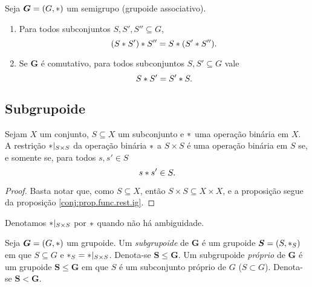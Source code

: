 \begin{exercise}
Seja $\bm G=(G,\ast)$ um semigrupo (grupoide associativo).
	\begin{enumerate}
	\item Para todos subconjuntos $S,S',S'' \subseteq G$,
		\begin{equation*}
		(S \ast S') \ast S'' = S \ast (S' \ast S'').
		\end{equation*}
	\item Se $\bm G$ é comutativo, para todos subconjuntos $S,S' \subseteq G$ vale
		\begin{equation*}
		S \ast S' = S' \ast S.
		\end{equation*}
	\end{enumerate}
\end{exercise}


\subsection{Subgrupoide}

\begin{proposition}[Fechamento]
\label{prop:fechamento.operacao.binaria}
Sejam $X$ um conjunto, $S \subseteq X$ um subconjunto e $\ast$ uma operação binária em $X$. A restrição $\ast|_{S \times S}$ da operação binária $\ast$ a $S \times S$ é uma operação binária em $S$ se, e somente se, para todos $s,s' \in S$
	\begin{equation*}
	s \ast s' \in S.
	\end{equation*}
\end{proposition}
\begin{proof}
Basta notar que, como $S \subseteq X$, então $S \times S \subseteq X \times X$, e a proposição segue da proposição \ref{conj:prop.func.rest.ig}.
\end{proof}

Denotamos $\ast |_{S \times S}$ por $\ast$ quando não há ambiguidade.

\begin{definition}
Seja $\bm G=(G,\ast)$ um grupoide. Um \emph{subgrupoide} de $\bm G$ é um grupoide $\bm S=(S,\ast_S)$ em que $S \subseteq G$ e $\ast_S= \ast|_{S \times S}$. Denota-se $\bm S \leq \bm G$. Um subgrupoide \emph{próprio} de $\bm G$ é um grupoide $\bm S \leq \bm G$ em que $S$ é um subconjunto próprio de $G$ ($S \subset G$). Denota-se $\bm S < \bm G$.
\end{definition}

